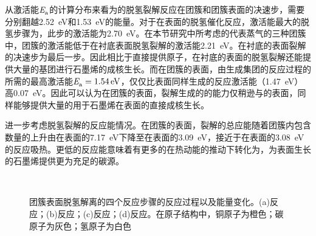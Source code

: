     

    从激活能$\it E_{\rm a}^{\rm } \it$的计算分布来看为的脱氢裂解反应在团簇和团簇表面的决速步，需要分别翻越\SI{2.52}{\electronvolt}和\SI{1.53}{\electronvolt}的能量。对于在表面的脱氢催化反应，激活能最大的脱氢步骤为，此步的激活能为\SI{2.70}{\electronvolt}。在本节研究中所考虑的代表蒸气的三种团簇中，团簇的激活能低于在衬底表面脱氢裂解的激活能\SI{2.21}{\electronvolt}。在衬底的表面裂解的决速步为最后一步。因此相比于直接提供原子，在衬底的表面的脱氢裂解还能提供大量的基团进行石墨烯的成核生长。而在团簇的表面，由生成集团的反应过程的所需的最高激活能$\it E_{\rm a}^{\rm } \it=\SI{1.54}{\electronvolt}$，仅仅比表面同样生成的反应激活能（\SI{1.47}{\electronvolt}）高\SI{0.07}{\electronvolt}。因此可以认为在团簇的表面，裂解生成的的能力仅稍逊与的表面，同样能够提供大量的用于石墨烯在表面的直接成核生长。 

    进一步考虑脱氢裂解的反应能情况。在团簇的表面，裂解的总应能随着团簇内包含数量的上升由在表面的\SI{7.17}{\electronvolt}下降至在表面的\SI{3.09}{\electronvolt}，接近于在表面的\SI{3.08}{\electronvolt}的反应吸热。更低的反应能意味着有更多的在热动能的推动下转化为，为表面生长的石墨烯提供更为充足的碳源。
    
    \begin{figure}[htb]
        \\[-0.5ex]
        \caption{团簇表面脱氢解离的四个反应步骤的反应过程以及能量变化。(a)反应\mbox{；}(b)反应\mbox{；}(c)反应\mbox{；}(d)反应。在原子结构中，铜原子为橙色；碳原子为灰色；氢原子为白色}
        \label{fig:CG_DFT_Cu3-CH4-C}
    \end{figure}

